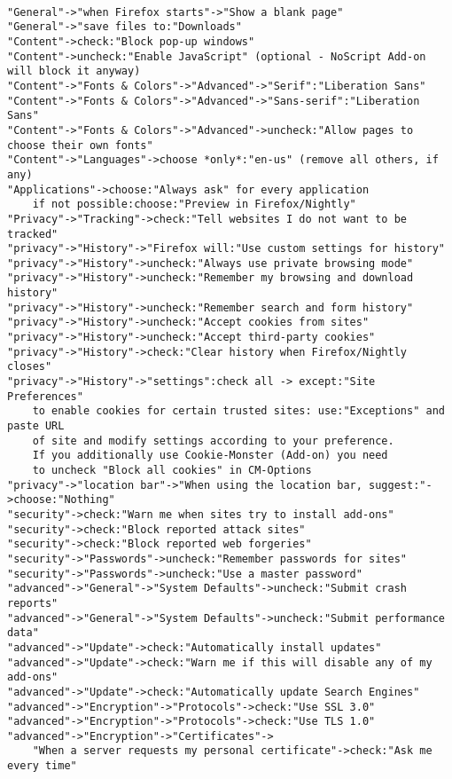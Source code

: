 \documentclass{article}
\begin{document}
\begin{lstlisting}

"General"->"when Firefox starts"->"Show a blank page"
"General"->"save files to:"Downloads"
"Content"->check:"Block pop-up windows"
"Content"->uncheck:"Enable JavaScript" (optional - NoScript Add-on will block it anyway)
"Content"->"Fonts & Colors"->"Advanced"->"Serif":"Liberation Sans"
"Content"->"Fonts & Colors"->"Advanced"->"Sans-serif":"Liberation Sans"
"Content"->"Fonts & Colors"->"Advanced"->uncheck:"Allow pages to choose their own fonts"
"Content"->"Languages"->choose *only*:"en-us" (remove all others, if any) 
"Applications"->choose:"Always ask" for every application
    if not possible:choose:"Preview in Firefox/Nightly"
"Privacy"->"Tracking"->check:"Tell websites I do not want to be tracked"
"privacy"->"History"->"Firefox will:"Use custom settings for history"
"privacy"->"History"->uncheck:"Always use private browsing mode"
"privacy"->"History"->uncheck:"Remember my browsing and download history"
"privacy"->"History"->uncheck:"Remember search and form history"
"privacy"->"History"->uncheck:"Accept cookies from sites"
"privacy"->"History"->uncheck:"Accept third-party cookies"
"privacy"->"History"->check:"Clear history when Firefox/Nightly closes"
"privacy"->"History"->"settings":check all -> except:"Site Preferences" 
    to enable cookies for certain trusted sites: use:"Exceptions" and paste URL 
    of site and modify settings according to your preference. 
    If you additionally use Cookie-Monster (Add-on) you need 
    to uncheck "Block all cookies" in CM-Options
"privacy"->"location bar"->"When using the location bar, suggest:"->choose:"Nothing"
"security"->check:"Warn me when sites try to install add-ons"
"security"->check:"Block reported attack sites"
"security"->check:"Block reported web forgeries"
"security"->"Passwords"->uncheck:"Remember passwords for sites"
"security"->"Passwords"->uncheck:"Use a master password"
"advanced"->"General"->"System Defaults"->uncheck:"Submit crash reports"
"advanced"->"General"->"System Defaults"->uncheck:"Submit performance data"
"advanced"->"Update"->check:"Automatically install updates"
"advanced"->"Update"->check:"Warn me if this will disable any of my add-ons"
"advanced"->"Update"->check:"Automatically update Search Engines"
"advanced"->"Encryption"->"Protocols"->check:"Use SSL 3.0"
"advanced"->"Encryption"->"Protocols"->check:"Use TLS 1.0"
"advanced"->"Encryption"->"Certificates"->
    "When a server requests my personal certificate"->check:"Ask me every time"

\end{lstlisting}
\end{document}
